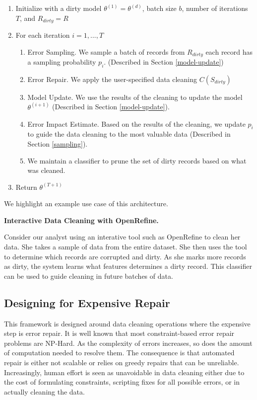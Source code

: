 \begin{enumerate}
\item Initialize with a dirty model $\theta^{(1)} = \theta^{(d)}$, batch size $b$, number of iterations $T$, and $R_{dirty} = R$
\item For each iteration $i=1,...,T$
\begin{enumerate}
\item Error Sampling. We sample a batch of records from $R_{dirty}$ each record has a sampling probability $p_i$. (Described in Section \ref{model-update})
\item Error Repair. We apply the user-specified data cleaning $C(S_{dirty})$
\item Model Update. We use the results of the cleaning to update the model $\theta^{(i+1)}$ (Described in Section \ref{model-update}).
\item Error Impact Estimate. Based on the results of the cleaning, we update $p_i$ to guide the data cleaning to the most valuable data (Described in Section \ref{sampling}).
\item We maintain a classifier to prune the set of dirty records based on what was cleaned.
\end{enumerate}
\item Return $\theta^{(T+1)}$
\end{enumerate}

\noindent We highlight an example use case of this architecture.

\vspace{0.5em}

\noindent\textbf{Interactive Data Cleaning with OpenRefine.}
\begin{example}
Consider our analyst using an interative tool such as OpenRefine \cite{openrefine} to clean her data. 
She takes a sample of data from the entire dataset.
She then uses the tool to determine which records are corrupted and dirty.
As she marks more records as dirty, the system learns what features determines a dirty record.
This classifier can be used to guide cleaning in future batches of data.
\end{example}

\subsection{Designing for Expensive Repair}
This framework is designed around data cleaning operations where the expensive step is error repair.
It is well known that most constraint-based error repair problems are NP-Hard.
As the complexity of errors increases, so does the amount of computation needed to resolve them.
The consequence is that automated repair is either not scalable or relies on greedy repairs that can be unreliable.
Increasingly, human effort is seen as unavoidable in data cleaning \cite{park2014crowdfill, wang2012crowder, gokhale2014corleone, wang1999sample} either due to the cost of formulating constraints, scripting fixes for all possible errors, or in actually cleaning the data.

